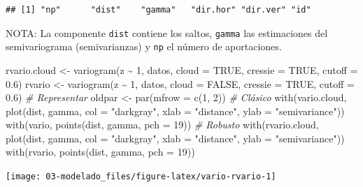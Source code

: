 \documentclass[
  spanish,
]{book}
\newenvironment{Shaded}{\begin{snugshade}}{\end{snugshade}}
\newcommand{\AttributeTok}[1]{\textcolor[rgb]{0.77,0.63,0.00}{#1}}
\newcommand{\CommentTok}[1]{\textcolor[rgb]{0.56,0.35,0.01}{\textit{#1}}}
\newcommand{\ConstantTok}[1]{\textcolor[rgb]{0.00,0.00,0.00}{#1}}
\newcommand{\DecValTok}[1]{\textcolor[rgb]{0.00,0.00,0.81}{#1}}
\newcommand{\FloatTok}[1]{\textcolor[rgb]{0.00,0.00,0.81}{#1}}
\newcommand{\FunctionTok}[1]{\textcolor[rgb]{0.00,0.00,0.00}{#1}}
\newcommand{\NormalTok}[1]{#1}
\newcommand{\OtherTok}[1]{\textcolor[rgb]{0.56,0.35,0.01}{#1}}
\newcommand{\SpecialCharTok}[1]{\textcolor[rgb]{0.00,0.00,0.00}{#1}}
\newcommand{\StringTok}[1]{\textcolor[rgb]{0.31,0.60,0.02}{#1}}
\theoremstyle{break}
\theoremstyle{definition}
\theoremstyle{definition}
\theoremstyle{definition}
\theoremstyle{definition}
\theoremstyle{remark}
\begin{document}
\begin{verbatim}
## [1] "np"      "dist"    "gamma"   "dir.hor" "dir.ver" "id"
\end{verbatim}

NOTA: La componente \texttt{dist} contiene los saltos, \texttt{gamma} las estimaciones del semivariograma (semivarianzas) y \texttt{np} el número de aportaciones.

\begin{Shaded}
\begin{Highlighting}[]
\NormalTok{rvario.cloud }\OtherTok{\textless{}{-}} \FunctionTok{variogram}\NormalTok{(z }\SpecialCharTok{\textasciitilde{}} \DecValTok{1}\NormalTok{, datos, }\AttributeTok{cloud =} \ConstantTok{TRUE}\NormalTok{, }\AttributeTok{cressie =} \ConstantTok{TRUE}\NormalTok{, }\AttributeTok{cutoff =} \FloatTok{0.6}\NormalTok{)}
\NormalTok{rvario }\OtherTok{\textless{}{-}} \FunctionTok{variogram}\NormalTok{(z }\SpecialCharTok{\textasciitilde{}} \DecValTok{1}\NormalTok{, datos, }\AttributeTok{cloud =} \ConstantTok{FALSE}\NormalTok{, }\AttributeTok{cressie =} \ConstantTok{TRUE}\NormalTok{, }\AttributeTok{cutoff =} \FloatTok{0.6}\NormalTok{)}
\CommentTok{\# Representar}
\NormalTok{oldpar }\OtherTok{\textless{}{-}} \FunctionTok{par}\NormalTok{(}\AttributeTok{mfrow =} \FunctionTok{c}\NormalTok{(}\DecValTok{1}\NormalTok{, }\DecValTok{2}\NormalTok{))}
\CommentTok{\# Clásico}
\FunctionTok{with}\NormalTok{(vario.cloud,  }\FunctionTok{plot}\NormalTok{(dist, gamma, }\AttributeTok{col =} \StringTok{"darkgray"}\NormalTok{, }
                        \AttributeTok{xlab =} \StringTok{"distance"}\NormalTok{, }\AttributeTok{ylab =}  \StringTok{"semivariance"}\NormalTok{))}
\FunctionTok{with}\NormalTok{(vario, }\FunctionTok{points}\NormalTok{(dist, gamma, }\AttributeTok{pch =} \DecValTok{19}\NormalTok{))}
\CommentTok{\# Robusto}
\FunctionTok{with}\NormalTok{(rvario.cloud,  }\FunctionTok{plot}\NormalTok{(dist, gamma, }\AttributeTok{col =} \StringTok{"darkgray"}\NormalTok{, }
                        \AttributeTok{xlab =} \StringTok{"distance"}\NormalTok{, }\AttributeTok{ylab =}  \StringTok{"semivariance"}\NormalTok{))}
\FunctionTok{with}\NormalTok{(rvario, }\FunctionTok{points}\NormalTok{(dist, gamma, }\AttributeTok{pch =} \DecValTok{19}\NormalTok{))}
\end{Highlighting}
\end{Shaded}

\begin{center}\texttt{[image: 03-modelado\_files/figure-latex/vario-rvario-1]} \end{center}
\end{document}

